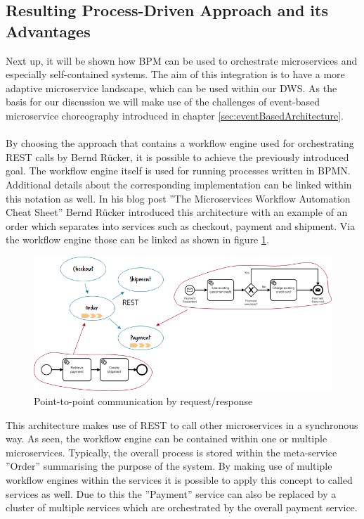 \subsection{Resulting Process-Driven Approach and its Advantages}
Next up, it will be shown how BPM can be used to orchestrate microservices and especially self-contained systems. The aim of this integration is to have a more adaptive microservice landscape, which can be used within our DWS. As the basis for our discussion we will make use of the challenges of event-based microservice choreography introduced in chapter \ref{sec:eventBasedArchitecture}.\newline
\\
\\
By choosing the approach that contains a workflow engine used for orchestrating REST calls by Bernd Rücker, it is possible to achieve the previously introduced goal. The workflow engine itself is used for running processes written in BPMN. Additional details about the corresponding implementation can be linked within this notation as well.\newline
In his blog post ''The Microservices Workflow Automation Cheat Sheet'' Bernd Rücker introduced this architecture with an example of an order which separates into services such as checkout, payment and shipment. Via the workflow engine those can be linked as shown in figure \ref{fig:RestArchitecture}. \cite{orchestrationMicroServices}\newline
\begin{figure}[!htb]
    \centering
    \includegraphics[scale=0.65]{pictures/RestArchitecture.png}
    \caption{Point-to-point communication by request/response \cite{orchestrationMicroServices}}
    \label{fig:RestArchitecture}
\end{figure}
This architecture makes use of REST to call other microservices in a synchronous way. As seen, the workflow engine can be contained within one or multiple microservices. \cite{orchestrationMicroServices} Typically, the overall process is stored within the meta-service ''Order'' summarising the purpose of the system. By making use of multiple workflow engines within the services it is possible to apply this concept to called services as well. Due to this the ''Payment'' service can also be replaced by a cluster of multiple services which are orchestrated by the overall payment service.\newline
